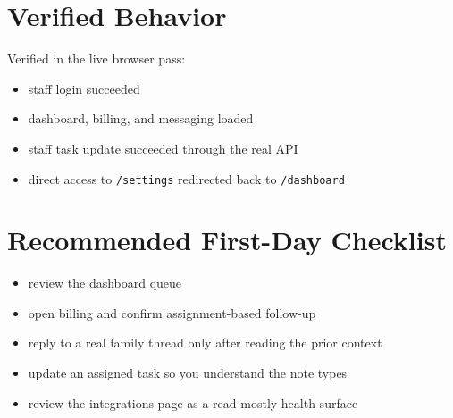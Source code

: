 \documentclass[11pt]{article}
\begin{document}
\section*{Verified Behavior}
Verified in the live browser pass:
\begin{itemize}
  \item staff login succeeded
  \item dashboard, billing, and messaging loaded
  \item staff task update succeeded through the real API
  \item direct access to \texttt{/settings} redirected back to \texttt{/dashboard}
\end{itemize}

\section*{Recommended First-Day Checklist}
\begin{itemize}
  \item review the dashboard queue
  \item open billing and confirm assignment-based follow-up
  \item reply to a real family thread only after reading the prior context
  \item update an assigned task so you understand the note types
  \item review the integrations page as a read-mostly health surface
\end{itemize}
\end{document}

